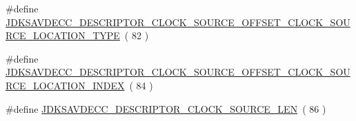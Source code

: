 \begin{DoxyCompactItemize}
\item 
\#define \hyperlink{group__descriptor__clock__source_gaa417a26c969700045261c12c3683cb95}{J\+D\+K\+S\+A\+V\+D\+E\+C\+C\+\_\+\+D\+E\+S\+C\+R\+I\+P\+T\+O\+R\+\_\+\+C\+L\+O\+C\+K\+\_\+\+S\+O\+U\+R\+C\+E\+\_\+\+O\+F\+F\+S\+E\+T\+\_\+\+C\+L\+O\+C\+K\+\_\+\+S\+O\+U\+R\+C\+E\+\_\+\+L\+O\+C\+A\+T\+I\+O\+N\+\_\+\+T\+Y\+PE}~( 82 )
\item 
\#define \hyperlink{group__descriptor__clock__source_ga82c6aef4ca115289cdddb47e61adf9cf}{J\+D\+K\+S\+A\+V\+D\+E\+C\+C\+\_\+\+D\+E\+S\+C\+R\+I\+P\+T\+O\+R\+\_\+\+C\+L\+O\+C\+K\+\_\+\+S\+O\+U\+R\+C\+E\+\_\+\+O\+F\+F\+S\+E\+T\+\_\+\+C\+L\+O\+C\+K\+\_\+\+S\+O\+U\+R\+C\+E\+\_\+\+L\+O\+C\+A\+T\+I\+O\+N\+\_\+\+I\+N\+D\+EX}~( 84 )
\item 
\#define \hyperlink{group__descriptor__clock__source_ga66ee17894f56080a6071a858519f83cd}{J\+D\+K\+S\+A\+V\+D\+E\+C\+C\+\_\+\+D\+E\+S\+C\+R\+I\+P\+T\+O\+R\+\_\+\+C\+L\+O\+C\+K\+\_\+\+S\+O\+U\+R\+C\+E\+\_\+\+L\+EN}~( 86 )
\end{DoxyCompactItemize}
